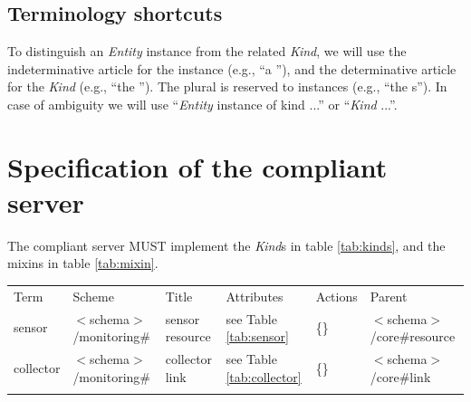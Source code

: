 \documentclass[10pt,a4paper]{article}
\begin{document}
\subsection{Terminology shortcuts}

To distinguish an {\em Entity} instance from the related {\em Kind}, we will use the indeterminative article for the instance (e.g., ``a \rs''), and the determinative article for the {\em Kind} (e.g., ``the \rs''). The plural is reserved to instances (e.g., ``the \rs s''). In case of ambiguity we will use ``{\em Entity} instance of kind ...'' or ``{\em Kind} ...''. 

\section{Specification of the compliant server}

The compliant server MUST implement the {\em Kind}s in table \ref{tab:kinds}, and the mixins in table \ref{tab:mixin}.

 {
        \begin{tabular}{llllll}
        \toprule
        Term & Scheme & Title & Attributes & Actions & Parent\\
        \colrule
        sensor &  $<$schema$>$/monitoring\# & sensor resource
        & see Table \ref{tab:sensor} & \{\} &  $<$schema$>$/core\#resource\\
        collector &  $<$schema$>$/monitoring\# & collector link
        & see Table \ref{tab:collector} & \{\} & $<$schema$>$/core\#link \\
        \botrule
        \end{tabular}
}
 
\end{document}
